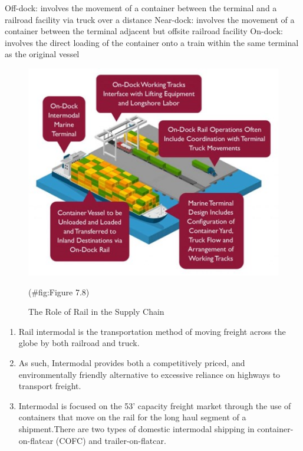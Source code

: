 \documentclass[
]{book}
\begin{document}
Off-dock: involves the movement of a container between the terminal and a railroad facility via truck over a distance
Near-dock: involves the movement of a container between the terminal adjacent but offsite railroad facility
On-dock: involves the direct loading of the container onto a train within the same terminal as the original vessel

\begin{figure}

{\centering \includegraphics{./Images/supplychain/The Role of Rail in the Supply Chain} 

}

\caption{The Role of Rail in the Supply Chain}(\#fig:Figure 7.8)
\end{figure}

\begin{enumerate}
\def\labelenumi{\arabic{enumi}.}
\setcounter{enumi}{2}
\item
  Rail intermodal is the transportation method of moving freight across the globe by both railroad and truck.
\item
  As such, Intermodal provides both a competitively priced, and environmentally friendly alternative to excessive reliance on highways to transport freight.
\item
  Intermodal is focused on the 53' capacity freight market through the use of containers that move on the rail for the long haul segment of a shipment.There are two types of domestic intermodal shipping in container-on-flatcar (COFC) and trailer-on-flatcar.
\end{enumerate}
\end{document}

